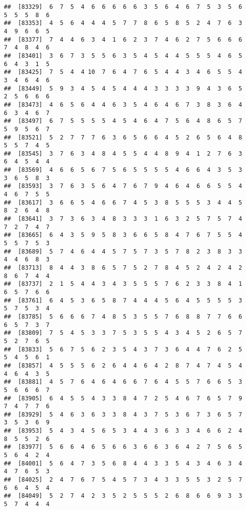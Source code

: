 \documentclass[
]{book}
\begin{document}
\begin{verbatim}
##  [83329]  6  7  5  4  6  6  6  6  6  3  5  6  4  6  7  5  3  5  6  5  5  5  8  6
##  [83353]  4  5  6  4  4  4  5  7  7  8  6  5  8  5  2  4  7  6  3  4  9  6  6  5
##  [83377]  7  4  4  6  3  4  1  6  2  3  7  4  6  2  7  5  6  6  6  7  4  8  4  6
##  [83401]  3  6  7  3  5  5  6  3  5  4  5  4  4  5  5  5  4  6  5  6  4  3  1  5
##  [83425]  7  5  4  4 10  7  6  4  7  6  5  4  4  3  4  6  5  5  4  3  4  6  4  6
##  [83449]  5  9  3  4  5  4  5  4  4  4  3  3  3  3  9  4  3  6  5  2  5  6  6  6
##  [83473]  4  6  5  6  4  4  6  3  5  4  6  4  6  7  3  8  3  6  4  6  3  4  6  7
##  [83497]  6  7  5  5  5  5  4  5  4  6  4  7  5  6  4  8  6  5  7  5  9  5  6  7
##  [83521]  5  2  7  7  7  6  3  6  5  6  6  4  5  2  6  5  6  4  8  5  5  7  4  5
##  [83545]  3  7  6  3  4  8  4  5  5  4  4  8  9  4  1  2  7  6  3  6  4  5  4  4
##  [83569]  4  6  6  5  6  7  5  6  5  5  5  5  4  6  6  4  3  5  3  3  6  5  8  3
##  [83593]  3  7  6  3  5  6  4  7  6  7  9  4  6  4  6  6  5  5  4  4  6  7  5  5
##  [83617]  3  6  6  5  4  6  6  7  4  5  3  8  5  5  5  3  4  4  5  8  2  6  4  8
##  [83641]  3  7  3  6  3  4  8  3  3  3  1  6  3  2  5  7  5  7  4  7  2  7  4  7
##  [83665]  6  4  3  5  9  5  8  3  6  6  5  8  4  7  6  7  5  5  4  5  5  7  5  3
##  [83689]  5  7  4  6  4  4  5  7  5  7  3  5  7  8  2  3  8  3  3  4  4  6  8  3
##  [83713]  8  4  4  3  8  6  5  7  5  2  7  8  4  5  2  4  2  4  2  8  6  7  4  4
##  [83737]  2  1  5  4  4  3  4  3  5  5  5  7  6  2  3  3  8  4  1  6  5  7  6  6
##  [83761]  6  4  5  3  6  5  8  7  4  4  4  5  6  4  5  5  5  5  3  5  7  5  3  4
##  [83785]  5  6  6  6  7  4  8  5  3  5  5  7  6  8  8  7  7  6  6  6  5  7  3  7
##  [83809]  7  5  4  5  3  3  7  5  3  5  5  4  3  4  5  2  6  5  7  5  2  7  6  5
##  [83833]  5  6  7  5  6  2  3  5  4  3  7  3  6  4  4  7  6  2  5  5  4  5  6  1
##  [83857]  4  5  5  5  6  2  6  4  4  6  4  2  8  7  4  7  4  5  4  4  6  4  3  5
##  [83881]  4  5  7  6  4  6  4  6  6  7  6  4  5  5  7  6  6  5  3  5  6  6  6  7
##  [83905]  6  4  5  5  4  3  3  8  4  7  2  5  4  6  7  6  5  7  9  7  4  7  7  6
##  [83929]  5  4  6  3  6  3  3  8  4  3  7  5  3  6  7  3  6  5  7  3  5  3  6  9
##  [83953]  5  4  3  4  5  6  5  3  4  4  3  6  3  3  4  6  6  2  4  8  5  5  2  6
##  [83977]  5  6  6  4  6  5  6  6  3  6  6  3  6  4  2  7  5  6  5  5  6  4  2  4
##  [84001]  5  6  4  7  3  5  6  8  4  4  3  3  5  4  3  4  6  3  4  4  7  6  5  3
##  [84025]  2  4  7  6  7  5  4  5  7  3  4  3  3  5  5  3  2  5  7  6  6  4  5  4
##  [84049]  5  2  7  4  2  3  5  2  5  5  5  2  6  8  6  6  9  3  3  5  7  4  4  4

\end{verbatim}
\end{document}
